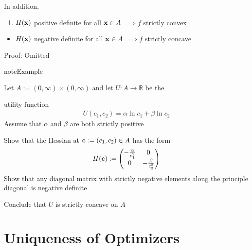 \documentclass[letterpaper,10pt,english]{jupyterBook}
\begin{document}
\sphinxAtStartPar
In addition,
\begin{enumerate}
%
\item {} 
\sphinxAtStartPar
\(H({\bf x})\) positive definite for all \({\bf x} \in A\)
\(\implies f\) strictly convex

\end{enumerate}
\begin{itemize}
\item {} 
\sphinxAtStartPar
\(H({\bf x})\) negative definite for all \({\bf x} \in A\)
\(\implies f\) strictly concave

\end{itemize}

\sphinxAtStartPar
Proof: Omitted

\begin{sphinxadmonition}{note}{Example}

\sphinxAtStartPar
Let \(A := (0, \infty) \times (0, \infty)\) and let \(U \colon A \to \mathbb{R}\) be the
\end{sphinxadmonition}

\sphinxAtStartPar
utility function
\begin{equation*}
\begin{split}
%
U(c_1, c_2) = \alpha \ln c_1 + \beta \ln c_2
%
\end{split}
\end{equation*}
\sphinxAtStartPar
Assume that \(\alpha\) and \(\beta\) are both strictly positive

\sphinxAtStartPar
{} Show that the Hessian at \({\bf c} := (c_1, c_2) \in A\) has the form
\begin{equation*}
\begin{split}
%
H({\bf c})
:=
\begin{pmatrix}
- \frac{\alpha}{c_1^2} & 0 \\
0 & - \frac{\beta}{c_2^2} 
\end{pmatrix}
%
\end{split}
\end{equation*}
\sphinxAtStartPar
{} Show that any diagonal matrix with strictly negative elements along
the principle diagonal is negative definite

\sphinxAtStartPar
Conclude that \(U\) is strictly concave on \(A\)


\section{Uniqueness of Optimizers}
\label{\detokenize{06.optimization_fundamentals:uniqueness-of-optimizers}}
\end{document}
